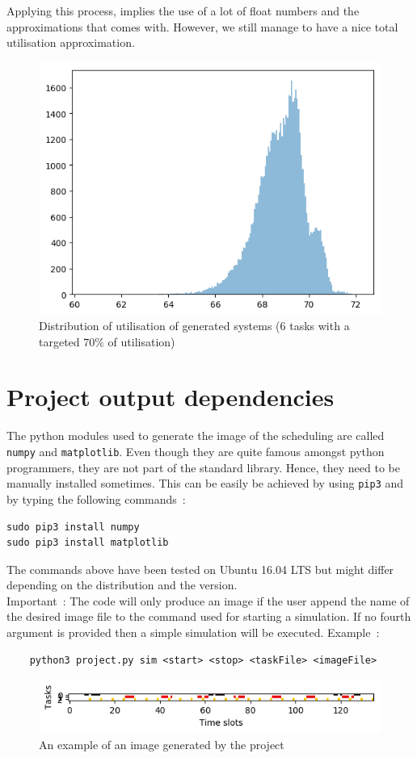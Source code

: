 \documentclass[a4paper,11pt]{article}
\begin{document}
  Applying this process, implies the use of a lot of float numbers and the approximations that comes with. However, we still manage to have a nice total utilisation approximation.
  \begin{figure}[h!]
    \centering
    \includegraphics[scale=0.7]{img/distribution.png}
    \caption{Distribution of utilisation of generated systems (6 tasks with a targeted $70\%$ of utilisation)}
  \end{figure}

\section{Project output dependencies}
  \label{sec:output-dependencies}
  The python modules used to generate the image of the scheduling are called \verb|numpy| and \verb|matplotlib|. Even though they are quite famous amongst python programmers, they are not part of the standard library. Hence, they need to be manually installed sometimes. This can be easily be achieved by using \verb|pip3| and by typing the following commands~:
  \begin{verbatim}
sudo pip3 install numpy
sudo pip3 install matplotlib
  \end{verbatim}
  The commands above have been tested on Ubuntu 16.04 LTS but might differ depending on the distribution and the version.\\
  
  \noindent Important~: The code will only produce an image if the user append the name of the desired image file to the command used for starting a simulation. If no fourth argument is provided then a simple simulation will be executed. Example~:
  \begin{verbatim}
    python3 project.py sim <start> <stop> <taskFile> <imageFile>
  \end{verbatim}
  \begin{figure}[ht!]
    \centering
    \includegraphics{img/schedule1.png}
    \caption{An example of an image generated by the project}
    \label{fig:scheduling-output-example}
  \end{figure}
\end{document}
